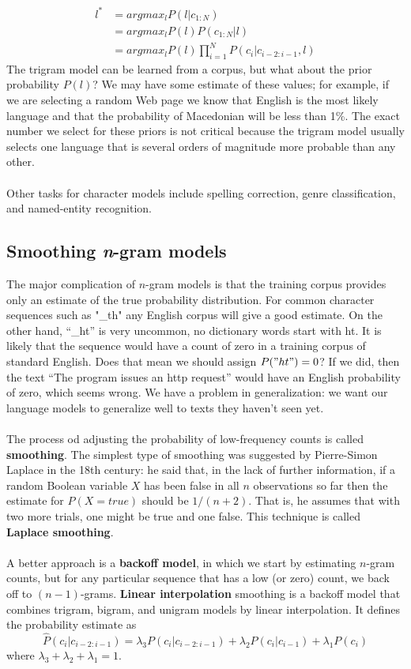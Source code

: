 \[\begin{split}
    l^* & = argmax_l P(l | c_{1:N})\\
    & = argmax_l P(l)P(c_{1:N}|l)\\
    & = argmax_l P(l) \prod_{i=1}^N P(c_i | c_{i-2:i-1}, l)
\end{split}
\]
The trigram model can be learned from a corpus, but what about the prior probability $P(l)$? We may have some estimate of these values; for example, if we are selecting a random Web page we know that English is the most likely language and that the probability of Macedonian will be less than 1\%. The exact number we select for these priors is not critical because the trigram model usually selects one language that is several orders of magnitude more probable than any other.\\\\
Other tasks for character models include spelling correction, genre classification, and named-entity recognition. 

\subsection{Smoothing \textit{n}-gram models}
The major complication of $n$-gram models is that the training corpus provides only an estimate of the true probability distribution. For common character sequences such as "\_th"  any English corpus will give a good estimate.  On the other hand, “\_ht” is very uncommon, no dictionary words start with ht.  It is likely that the sequence would have a count of zero in a training corpus of standard English. Does that mean we should assign $P("ht")=0$?  If we did, then the text “The program issues an http request” would have an English probability of zero, which seems wrong. We have a problem in generalization: we want our language models to generalize well to texts they haven’t seen yet.\\\\
The process od adjusting the probability of low-frequency counts is called \textbf{smoothing}. The simplest type of smoothing was suggested by Pierre-Simon Laplace in the 18th century: he said that, in the lack of further information, if a random Boolean variable $X$ has been false in all $n$ observations so far then the estimate for $P(X = true)$ should be $1/(n+ 2)$. That is, he assumes that with two more trials, one might be true and one false. This technique is called \textbf{Laplace smoothing}.\\\\
A better approach is a \textbf{backoff model}, in which we start by estimating $n$-gram counts, but for any particular sequence that has a low (or zero) count, we back off to $(n - 1)$-grams. \textbf{Linear interpolation} smoothing is a backoff model that combines trigram, bigram, and unigram models by linear interpolation. It defines the probability estimate as
\[\hat{P}(c_i | c_{i-2:i-1}) = \lambda_3 P(c_i | c_{i-2:i-1}) + \lambda_2 P(c_i | c_{i-1}) + \lambda_1 P(c_i)\]
where $\lambda_3 + \lambda_2 + \lambda_1 = 1$.

